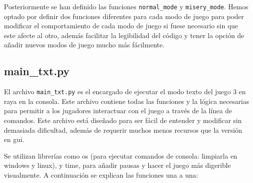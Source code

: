 \documentclass[a4paper,12pt]{article}
\begin{document}
\vspace{\baselineskip}
Posteriormente se han definido las funciones \texttt{normal\_mode} y \texttt{misery\_mode}. Hemos optado por definir dos funciones diferentes para cada modo de juego para poder 
modificar el comportamiento de cada modo de juego si fuese necesario sin que este afecte al otro, además facilitar la legibilidad del código y tener la opción de añadir nuevos 
modos de juego mucho más fácilmente.

\subsection{main\_txt.py}
El archivo \texttt{main\_txt.py} es el encargado de ejecutar el modo texto del juego 3 en raya en la consola. Este archivo contiene todas las funciones y la lógica necesarias para 
permitir a los jugadores interactuar con el juego a través de la línea de comandos. Este archivo está diseñado para ser fácil de entender y modificar sin demasiada dificultad, además
de requerir muchos menos recursos que la versión en gui.

\vspace{\baselineskip}
Se utilizan librerías como os (para ejecutar comandos de consola: limpiarla en windows y linux), y time, para añadir pausas y hacer el juego más digerible visualmente.
A continuación se explican las funciones una a una:
\end{document}
